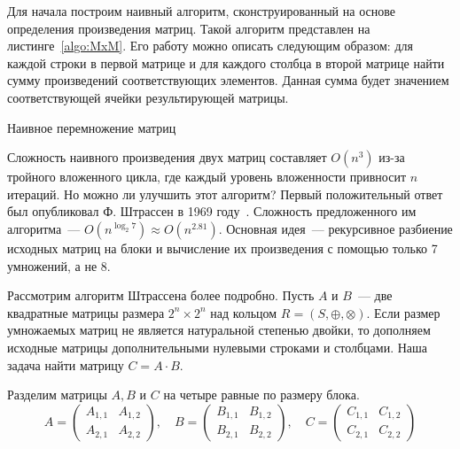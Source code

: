 Для начала построим наивный алгоритм, сконструированный на основе определения произведения матриц.
Такой алгоритм представлен на листинге~\ref{algo:MxM}.
Его работу можно описать следующим образом: для каждой строки в первой матрице и для каждого столбца в второй матрице найти сумму произведений соответствующих элементов.
Данная сумма будет значением соответствующей ячейки результирующей матрицы.
\begin{algorithm}
    \caption{Наивное перемножение матриц}
    \label{algo:MxM}

    \DontPrintSemicolon
    \SetAlgoNoLine
    \SetAlgoNoEnd


\end{algorithm}

Сложность наивного произведения двух матриц составляет $O(n^3)$ из-за тройного вложенного цикла, где каждый уровень вложенности привносит $n$ итераций.
Но можно ли улучшить этот алгоритм?
Первый положительный ответ был опубликовал Ф. Штрассен в 1969 году~.
Сложность предложенного им алгоритма~--- $O(n^{\log_2 7}) \approx O(n^{2.81})$.
Основная идея~--- рекурсивное разбиение исходных матриц на блоки и вычисление их произведения с помощью только 7 умножений, а не 8.

Рассмотрим алгоритм Штрассена более подробно.
Пусть $A$ и $B$~--- две квадратные матрицы размера $2^n \times 2^n$ над кольцом $R=(S, \oplus, \otimes)$.
Если размер умножаемых матриц не является натуральной степенью двойки, то дополняем исходные матрицы дополнительными нулевыми строками и столбцами.
Наша задача найти матрицу $C = A \cdot B$.

Разделим матрицы $A, B$ и $C$ на четыре равные по размеру блока.
\[
    A =
    \begin{pmatrix}
        A_{1,1} & A_{1,2} \\
        A_{2,1} & A_{2,2}
    \end{pmatrix},
    \quad
    B =
    \begin{pmatrix}
        B_{1,1} & B_{1,2} \\
        B_{2,1} & B_{2,2}
    \end{pmatrix},
    \quad
    C =
    \begin{pmatrix}
        C_{1,1} & C_{1,2} \\
        C_{2,1} & C_{2,2}
    \end{pmatrix}
\]

